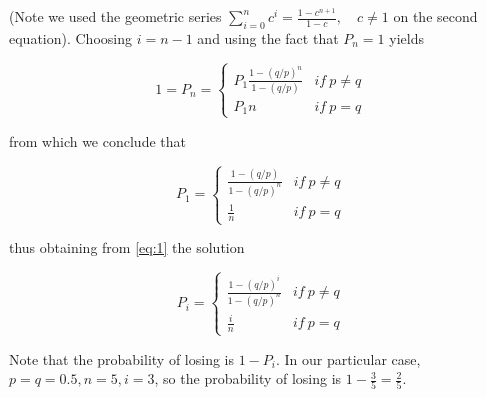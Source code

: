 \documentclass[12pt, a4paper]{article} %
\begin{document}
\begin{enumerate}[label=(\alph*)]
  (Note we used the geometric series $\sum_{i=0}^{n} c^{i} = \frac{1 - c^{n+1}}{1-c}, \quad c \neq 1$ on the second equation). Choosing $i = n - 1$ and using the fact that $P_{n} = 1$ yields

  \begin{equation*}
    1 = P_{n} = \begin{cases}
                 P_{1}\frac{1-(q/p)^{n}}{1-(q/p)} & if \ p \neq q\\
                 P_{1}n & if \ p = q
                \end{cases}
  \end{equation*}

  from which we conclude that

  \begin{equation*}
       P_{1} = \begin{cases}
                 \frac{1-(q/p)}{1-(q/p)^{n}} & if \ p \neq q\\
                 \frac{1}{n} & if \ p = q
                \end{cases}
  \end{equation*}

  thus obtaining from \ref{eq:1} the solution

  \begin{equation*}
       P_{i} = \begin{cases}
                 \frac{1-(q/p)^{i}}{1-(q/p)^{n}} & if \ p \neq q\\
                 \frac{i}{n} & if \ p = q
                \end{cases}
  \end{equation*}

  Note that the probability of losing is $1 - P_{i}$. In our particular case, $p = q = 0.5, n = 5, i = 3$, so the probability of losing is $1 - \frac{3}{5} = \frac{2}{5}$.

\end{enumerate}
\end{document}
